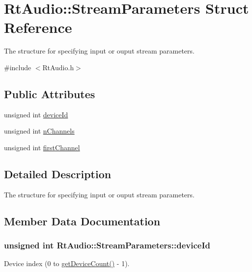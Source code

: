 \hypertarget{struct_rt_audio_1_1_stream_parameters}{}\section{Rt\+Audio\+:\+:Stream\+Parameters Struct Reference}
\label{struct_rt_audio_1_1_stream_parameters}


The structure for specifying input or ouput stream parameters.  




{\ttfamily \#include $<$Rt\+Audio.\+h$>$}

\subsection*{Public Attributes}
\begin{DoxyCompactItemize}
\item 
unsigned int \hyperlink{struct_rt_audio_1_1_stream_parameters_ab3c72bcf3ef12149ae9a4fb597cc5489}{device\+Id}
\item 
unsigned int \hyperlink{struct_rt_audio_1_1_stream_parameters_a88a10091b6e284e21235cc6f25332ebd}{n\+Channels}
\item 
unsigned int \hyperlink{struct_rt_audio_1_1_stream_parameters_ad4b4503782653ec93c83328c46abe50c}{first\+Channel}
\end{DoxyCompactItemize}


\subsection{Detailed Description}
The structure for specifying input or ouput stream parameters. 

\subsection{Member Data Documentation}
\subsubsection[{device\+Id}]{\setlength{\rightskip}{0pt plus 5cm}unsigned int Rt\+Audio\+::\+Stream\+Parameters\+::device\+Id}\hypertarget{struct_rt_audio_1_1_stream_parameters_ab3c72bcf3ef12149ae9a4fb597cc5489}{}\label{struct_rt_audio_1_1_stream_parameters_ab3c72bcf3ef12149ae9a4fb597cc5489}
Device index (0 to \hyperlink{class_rt_audio_a747ce2d73803641bbb66d6e78092aa1a}{get\+Device\+Count()} -\/ 1). 
